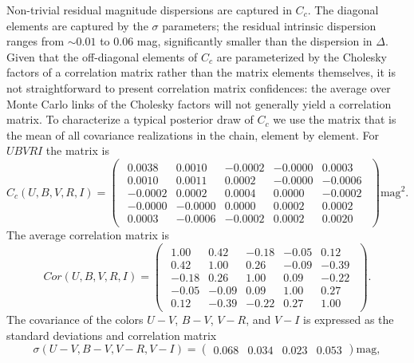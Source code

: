 \documentclass{aastex61}   	%
\begin{document}
Non-trivial residual magnitude dispersions are captured in $C_c$.  The diagonal elements are captured by the $\sigma$ parameters;
the residual intrinsic dispersion ranges from
$\sim 0.01$ to 0.06 mag, significantly smaller
than the dispersion in $\Delta$.  Given that the 
off-diagonal elements of $C_c$ are parameterized by the Cholesky factors of a correlation matrix rather than the matrix elements themselves,
it is not straightforward to present correlation matrix confidences:
the average over Monte Carlo links of the
Cholesky factors will not  generally yield a correlation matrix.  
To characterize a typical posterior draw of $C_c$ we use the matrix that is the mean of all covariance realizations in the
chain, element by element.
For $UBVRI$ the matrix is
\begin{equation}
C_c(U,B,V,R,I)=
\begin{pmatrix}
\begin{array}{rrrrr}
0.0038 & 0.0010 & -0.0002 & -0.0000 & 0.0003 \\
0.0010 & 0.0011 & 0.0002 & -0.0000 & -0.0006 \\
-0.0002 & 0.0002 & 0.0004 & 0.0000 & -0.0002 \\
-0.0000 & -0.0000 & 0.0000 & 0.0002 & 0.0002 \\
0.0003 & -0.0006 & -0.0002 & 0.0002 & 0.0020
\end{array}
 \end{pmatrix} \text{mag}^2.
 \label{mag_cov:eqn}
 \end{equation}
The average correlation matrix is
\begin{equation}
Cor(U,B,V,R,I)=
\begin{pmatrix}
\begin{array}{rrrrr}
1.00 & 0.42 & -0.18 & -0.05 & 0.12 \\
0.42 & 1.00 & 0.26 & -0.09 & -0.39 \\
-0.18 & 0.26 & 1.00 & 0.09 & -0.22 \\
-0.05 & -0.09 & 0.09 & 1.00 & 0.27 \\
0.12 & -0.39 & -0.22 & 0.27 & 1.00
\end{array}
 \end{pmatrix}.
 \end{equation}
The  covariance of the colors $U-V$, $B-V$, $V-R$, and $V-I$ is
expressed as the standard deviations and
correlation matrix
 \begin{equation}
 \sigma(U-V, B-V, V-R, V-I)=
 \begin{pmatrix}
0.068 & 0.034 & 0.023 & 0.053
  \end{pmatrix} \text{mag},
 \label{color_sd:eqn}
 \end{equation}
\end{document}
